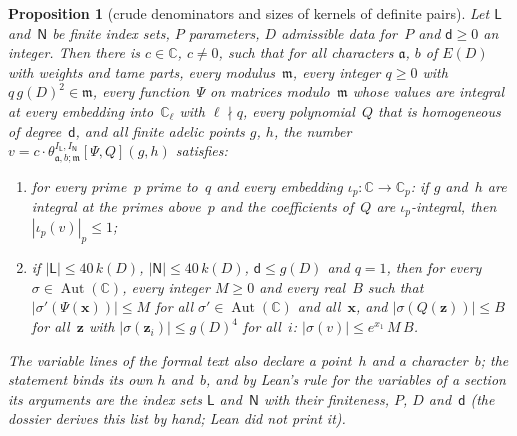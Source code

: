 \documentclass[11pt,a4paper]{article}
\newcommand{\m}[1]{\mbox{$#1$}}        %
\theoremstyle{plainx}
\newtheorem{proposition}[theorem]{Proposition}
\theoremstyle{uprightx}
\newcommand{\CC}{\mathbb{C}}
\newcommand{\ix}[1]{\mathsf{#1}}
\newcommand{\tk}[7]{\theta^{#1,#2}_{#3,#4;#5}[#6,#7]}
\newcommand{\AutC}{\operatorname{Aut}(\CC)}
\begin{document}
\begin{proposition}[crude denominators and sizes of kernels of definite pairs]\label{p:crude}
Let \m{\ix L} and~\m{\ix N} be finite index sets, $P$ parameters, $D$ admissible data for~$P$ and
\m{\mathsf{d}\ge0} an integer. Then there is \m{c\in\CC}, \m{c\ne0}, such that for all characters $\mathfrak{a}$, $b$ of \m{E(D)} with weights and tame
parts, every modulus~$\mathfrak{m}$, every integer \m{q\ge0} with \m{q\,g(D)^2\in\mathfrak{m}}, every function~$\Psi$
on matrices modulo~$\mathfrak{m}$ whose values are integral at every embedding into~$\CC_\ell$ with
\m{\ell\nmid q}, every polynomial~$Q$ that is homogeneous of degree~$\mathsf{d}$, and all finite adelic points $g$, $h$,
the
number \m{v=c\cdot\tk{I_{\ix L}}{I_{\ix N}}{\mathfrak{a}}{b}{\mathfrak{m}}{\Psi}{Q}(g,h)} satisfies:
\begin{enumerate}[label=\textup{(\roman*)},leftmargin=2.3em,itemsep=2pt]
\item for every prime~$p$ prime to~$q$ and every embedding \m{\iota_p\colon\CC\to\CC_p}: if $g$ and~$h$ are integral at
the primes above~$p$ and the coefficients of~$Q$ are $\iota_p$-integral, then \m{|\iota_p(v)|_p\le1};
\item if \m{|\ix L|\le40\,k(D)}, \m{|\ix N|\le40\,k(D)}, \m{\mathsf{d}\le g(D)} and \m{q=1}, then for every \m{\sigma\in\AutC},
every integer \m{M\ge0} and every real~$B$ such that \m{|\sigma'(\Psi(\mathbf{x}))|\le M} for all \m{\sigma'\in\AutC} and
all~$\mathbf{x}$, and \m{|\sigma(Q(\mathbf{z}))|\le B} for all~$\mathbf{z}$ with \m{|\sigma(\mathbf{z}_i)|\le g(D)^4} for all~$i$:
\m{|\sigma(v)|\le e^{x_1}\,M\,B}.
\end{enumerate}
The variable lines of the formal text also declare a point~$h$ and a character~$b$; the statement binds its
own $h$ and~$b$, and by Lean's rule for the variables of a section its arguments are the index sets \m{\ix L}
and~\m{\ix N} with their finiteness, $P$, $D$ and~\m{\mathsf{d}} (the dossier derives this list by hand; Lean did not
print it).
\end{proposition}
\end{document}
